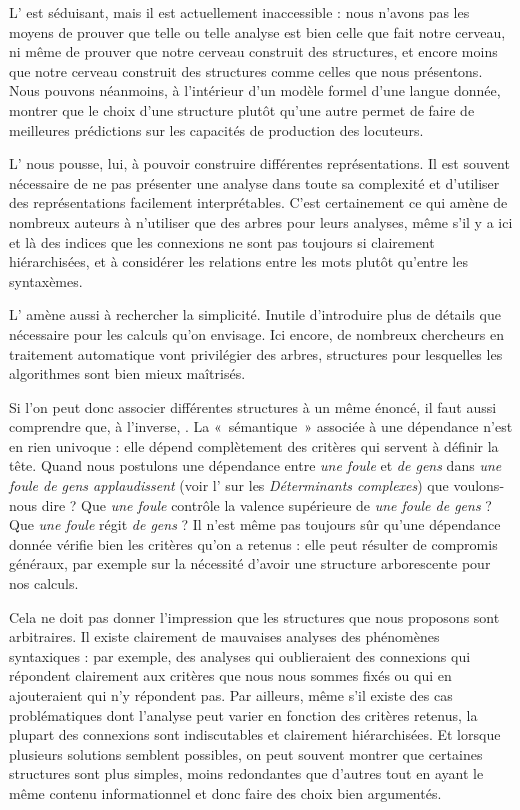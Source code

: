 L’ est séduisant, mais il est actuellement inaccessible : nous n’avons pas les moyens de prouver que telle ou telle analyse est bien celle que fait notre cerveau, ni même de prouver que notre cerveau construit des structures, et encore moins que notre cerveau construit des structures comme celles que nous présentons. Nous pouvons néanmoins, à l’intérieur d’un modèle formel d’une langue donnée, montrer que le choix d’une structure plutôt qu’une autre permet de faire de meilleures prédictions sur les capacités de production des locuteurs.

L’ nous pousse, lui, à pouvoir construire différentes représentations. Il est souvent nécessaire de ne pas présenter une analyse dans toute sa complexité et d’utiliser des représentations facilement interprétables. C’est certainement ce qui amène de nombreux auteurs à n’utiliser que des arbres pour leurs analyses, même s’il y a ici et là des indices que les connexions ne sont pas toujours si clairement hiérarchisées, et à considérer les relations entre les mots plutôt qu'entre les syntaxèmes.

L’ amène aussi à rechercher la simplicité. Inutile d’introduire plus de détails que nécessaire pour les calculs qu’on envisage. Ici encore, de nombreux chercheurs en traitement automatique vont privilégier des arbres, structures pour lesquelles les algorithmes sont bien mieux maîtrisés.

Si l’on peut donc associer différentes structures à un même énoncé, il faut aussi comprendre que, à l’inverse, . La «~sémantique~» associée à une dépendance n’est en rien univoque : elle dépend complètement des critères qui servent à définir la tête. Quand nous postulons une dépendance entre \textit{une foule} et \textit{de gens} dans \textit{une foule de gens applaudissent} (voir l’ sur les \textit{Déterminants complexes}) que voulons-nous dire ? Que \textit{une foule} contrôle la valence supérieure de \textit{une foule de gens} ? Que \textit{une foule} régit \textit{de gens} ? Il n’est même pas toujours sûr qu’une dépendance donnée vérifie bien les critères qu’on a retenus : elle peut résulter de compromis généraux, par exemple sur la nécessité d’avoir une structure arborescente pour nos calculs.

Cela ne doit pas donner l’impression que les structures que nous proposons sont arbitraires. Il existe clairement de mauvaises analyses des phénomènes syntaxiques : par exemple, des analyses qui oublieraient des connexions qui répondent clairement aux critères que nous nous sommes fixés ou qui en ajouteraient qui n’y répondent pas. Par ailleurs, même s’il existe des cas problématiques dont l’analyse peut varier en fonction des critères retenus, la plupart des connexions sont indiscutables et clairement hiérarchisées. Et lorsque plusieurs solutions sem\-blent possibles, on peut souvent montrer que certaines structures sont plus simples, moins redondantes que d’autres tout en ayant le même contenu informationnel et donc faire des choix bien argumentés.

